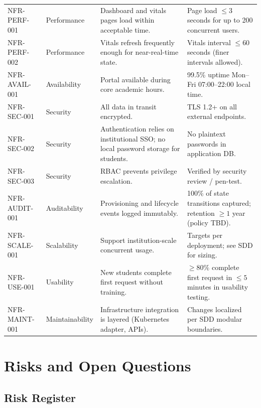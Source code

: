 \documentclass[12pt,a4paper]{article}
\begin{document}
\begin{longtable}{@{}L{2.4cm}L{2.5cm}L{5.3cm}L{4.5cm}@{}}
  NFR-PERF-001 & Performance & Dashboard and vitals pages load within acceptable time. & Page load $\leq 3$ seconds for up to 200 concurrent users. \\
    NFR-PERF-002 & Performance & Vitals refresh frequently enough for near-real-time state. & Vitals interval $\leq 60$ seconds (finer intervals allowed). \\
  NFR-AVAIL-001 & Availability & Portal available during core academic hours. & 99.5\% uptime Mon--Fri 07:00--22:00 local time. \\
    NFR-SEC-001 & Security & All data in transit encrypted. & TLS 1.2+ on all external endpoints. \\
  NFR-SEC-002 & Security & Authentication relies on institutional SSO; no local password storage for students. & No plaintext passwords in application DB. \\
    NFR-SEC-003 & Security & RBAC prevents privilege escalation. & Verified by security review / pen-test. \\
  NFR-AUDIT-001 & Auditability & Provisioning and lifecycle events logged immutably. & 100\% of state transitions captured; retention $\geq 1$ year (policy TBD). \\
    NFR-SCALE-001 & Scalability & Support institution-scale concurrent usage. & Targets per deployment; see SDD for sizing. \\
  NFR-USE-001 & Usability & New students complete first request without training. & $\geq 80\%$ complete first request in $\leq 5$ minutes in usability testing. \\
    NFR-MAINT-001 & Maintainability & Infrastructure integration is layered (Kubernetes adapter, APIs). & Changes localized per SDD modular boundaries. \\
\end{longtable}

\newpage
\section{Risks and Open Questions}

\subsection{Risk Register}
\end{document}
